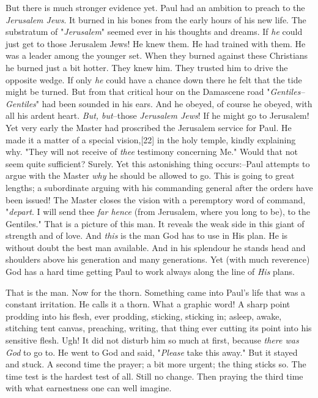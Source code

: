 But there is much stronger evidence yet. Paul had an ambition to preach to
the \textit{Jerusalem Jews}. It burned in his bones from the early hours of his
new life. The substratum of "\textit{Jerusalem}" seemed ever in his thoughts and
dreams. If \textit{he} could just get to those Jerusalem Jews! He knew them. He
had trained with them. He was a leader among the younger set. When they
burned against these Christians he burned just a bit hotter. They knew
him. They trusted him to drive the opposite wedge. If only \textit{he} could have
a chance down there he felt that the tide might be turned. But from that
critical hour on the Damascene road "\textit{Gentiles--Gentiles}" had been
sounded in his ears. And he obeyed, of course he obeyed, with all his
ardent heart. \textit{But, but}--those \textit{Jerusalem Jews}! If he might go to
Jerusalem! Yet very early the Master had proscribed the Jerusalem service
for Paul. He made it a matter of a special vision,[22] in the holy temple,
kindly explaining why. "They will not receive of \textit{thee} testimony
concerning Me." Would that not seem quite sufficient? Surely. Yet this
astonishing thing occurs:--Paul attempts to argue with the Master \textit{why} he
should be allowed to go. This is going to great lengths; a subordinate
arguing with his commanding general after the orders have been issued! The
Master closes the vision with a peremptory word of command, "\textit{depart}. I
will send thee \textit{far hence} (from Jerusalem, where you long to be), to the
Gentiles." That is a picture of this man. It reveals the weak side in
this giant of strength and of love. And \textit{this} is the man God has to use
in His plan. He is without doubt the best man available. And in his
splendour he stands head and shoulders above his generation and many
generations. Yet (with much reverence) God has a hard time getting Paul to
work always along the line of \textit{His} plans.

That is the man. Now for the thorn. Something came into Paul's life that
was a constant irritation. He calls it a thorn. What a graphic word! A
sharp point prodding into his flesh, ever prodding, sticking, sticking in;
asleep, awake, stitching tent canvas, preaching, writing, that thing ever
cutting its point into his sensitive flesh. Ugh! It did not disturb him so
much at first, because \textit{there was God} to go to. He went to God and said,
"\textit{Please} take this away." But it stayed and stuck. A second time the
prayer; a bit more urgent; the thing sticks so. The time test is the
hardest test of all. Still no change. Then praying the third time with
what earnestness one can well imagine.

